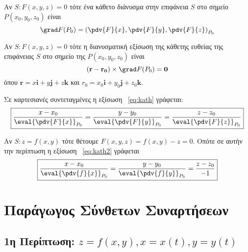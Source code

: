 \begin{myitemize}
  \item Αν $S: F(x,y,z)=0$ τότε ένα κάθετο διάνυσμα στην επιφάνεια $S$ 
    στο σημείο $ P(x_{0}, y_{0}, z_{0}) $ είναι
    \[
      \grad F{(P_{0})} = \left(\pdv{F}{x}, \pdv{F}{y}, \pdv{F}{z}\right)_{P_{0}}
    \]
  \item Αν $S: F(x,y,z)=0$ τότε η διανυσματική εξίσωση της κάθετης ευθείας της 
    επιφάνειας $S$ στο σημείο της $ P(x_{0}, y_{0}, z_{0}) $ είναι
    \begin{equation}\label{eq:kath}
      (\mathbf{r} - \mathbf{r_{0}}) \times \grad F(P_{0}) = \mathbf{0}
    \end{equation} 
    όπου $ \mathbf{r}=x \mathbf{i}+y \mathbf{j}+z \mathbf{k} $ και 
    $ r_{0}=x_{0} \mathbf{i}+ y _{0} \mathbf{j}+ z_{0} \mathbf{k} $.

    Σε καρτεσιανές συντεταγμένες η εξίσωση ~\eqref{eq:kath} γράφεται:
    \begin{equation}\label{eq:kath2}
      \boxed{ 
        \frac{x- x_{0}}{\eval{\pdv{F}{x}} _{P_{0}}} = 
        \frac{y- y_{0}}{\eval{\pdv{F}{y}} _{P_{0}}} = 
        \frac{z- z_{0}}{\eval{\pdv{F}{z}} _{P_{0}}}  
      }
    \end{equation}

  \item Αν $ S: z=f(x,y) $ τότε θέτουμε $ F(x,y,z) =  f(x,y) - z = 0 $. Οπότε σε
    αυτήν την περίπτωση η εξίσωση ~\eqref{eq:kath2} γράφεται
    \[
      \boxed{
        \frac{x- x_{0}}{\eval{\pdv{f}{x}} _{P_{0}}} = 
        \frac{y- y_{0}}{\eval{\pdv{f}{y}} _{P_{0}}} = 
        \frac{z- z_{0}}{-1} 
      }
    \] 
\end{myitemize}

\chapter{Παράγωγος Σύνθετων Συναρτήσεων}

\section{1η Περίπτωση: \ensuremath{z=f(x,y),  x=x(t),  y=y(t)}} 

